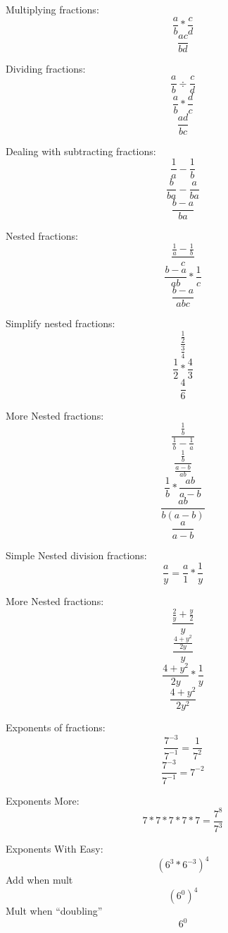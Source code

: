 \documentclass{article}
\begin{document}
Multiplying fractions:
$$\frac{a}{b} * \frac{c}{d}$$
$$\frac{ac}{bd}$$

Dividing fractions:
$$\frac{a}{b} \div \frac{c}{d}$$
$$\frac{a}{b} * \frac{d}{c}$$
$$\frac{ad}{bc}$$

Dealing with subtracting fractions:
$$\frac{1}{a} - \frac{1}{b}$$
$$\frac{b}{ba} - \frac{a}{ba}$$
$$\frac{b-a}{ba}$$

Nested fractions:
$$\frac{\frac{1}{a} - \frac{1}{b}}{c}$$
$$\frac{b-a}{ab} * \frac{1}{c}$$
$$\frac{b-a}{abc}$$

Simplify nested fractions:
$$\frac{\frac{1}{2}}{\frac{3}{4}}$$
$$\frac{1}{2}*\frac{4}{3}$$
$$\frac{4}{6}$$

More Nested fractions:
$$\frac{\frac{1}{b}}{\frac{1}{b} - \frac{1}{a}}$$
$$\frac{\frac{1}{b}}{\frac{a-b}{ab}}$$
$$\frac{1}{b}*\frac{ab}{a-b}$$
$$\frac{ab}{b(a-b)}$$
$$\frac{a}{a-b}$$

Simple Nested division fractions:
$$\frac{a}{y} = \frac{a}{1}*\frac{1}{y}$$

More Nested fractions:
$$\frac{\frac{2}{y}+\frac{y}{2}}{y}$$
$$\frac{\frac{4+y^2}{2y}}{y}$$
$$\frac{4+y^2}{2y}*\frac{1}{y}$$
$$\frac{4+y^2}{2y^2}$$

Exponents of fractions:
$$\frac{7^{-3}}{7^{-1}} = \frac{1}{7^{2}}$$
$$\frac{7^{-3}}{7^{-1}} = 7^{-2}$$

Exponents More:
$$7*7*7*7*7 = \frac{7^{8}}{7^{3}}$$

Exponents With Easy:
$$(6^{3}*6^{-3})^{4}$$
Add when mult
$$(6^{0})^{4}$$
Mult when ``doubling''
$$6^{0}$$
\end{document}
